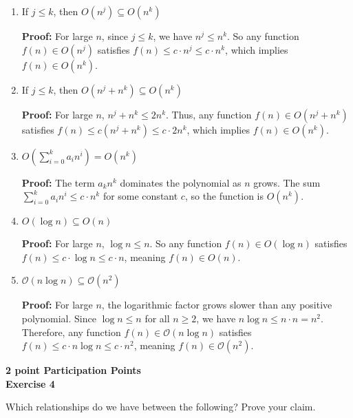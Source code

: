 \documentclass{article}
\theoremstyle{theorem}
\theoremstyle{definition}
\theoremstyle{remark}
\begin{document}
\begin{enumerate}
    \item If \( j \leq k \), then \( O(n^j) \subseteq O(n^k) \)

    \textbf{Proof:} For large \( n \), since \( j \leq k \), we have \( n^j \leq n^k \). So any function \( f(n) \in O(n^j) \) satisfies \( f(n) \leq c \cdot n^j \leq c \cdot n^k \), which implies \( f(n) \in O(n^k) \).

    \item If \( j \leq k \), then \( O(n^j + n^k) \subseteq O(n^k) \)

    \textbf{Proof:} For large \( n \), \( n^j + n^k \leq 2n^k \). Thus, any function \( f(n) \in O(n^j + n^k) \) satisfies \( f(n) \leq c(n^j + n^k) \leq c \cdot 2n^k \), which implies \( f(n) \in O(n^k) \).

    \item \( O\left( \sum_{i=0}^{k} a_i n^i \right) = O(n^k) \)

    \textbf{Proof:} The term \( a_k n^k \) dominates the polynomial as \( n \) grows. The sum \( \sum_{i=0}^{k} a_i n^i \leq c \cdot n^k \) for some constant \( c \), so the function is \( O(n^k) \).

    \item \( O(\log n) \subseteq O(n) \)

    \textbf{Proof:} For large \( n \), \( \log n \leq n \). So any function \( f(n) \in O(\log n) \) satisfies \( f(n) \leq c \cdot \log n \leq c \cdot n \), meaning \( f(n) \in O(n) \).

    \item \( \mathcal{O}(n \log n) \subseteq \mathcal{O}(n^2) \)

    \textbf{Proof:} For large \( n \), the logarithmic factor grows slower than any positive polynomial. Since \( \log n \leq n \) for all \( n \geq 2 \), we have \( n \log n \leq n \cdot n = n^2 \). Therefore, any function \( f(n) \in \mathcal{O}(n \log n) \) satisfies \( f(n) \leq c \cdot n \log n \leq c \cdot n^2 \), meaning \( f(n) \in \mathcal{O}(n^2) \).

\end{enumerate}

\textbf {2 point Participation Points}\\
\textbf{Exercise 4}

Which relationships do we have between the following? Prove your claim.
\end{document}
